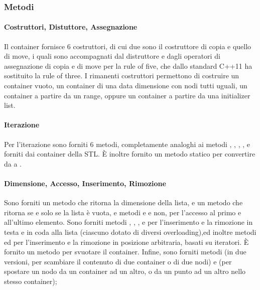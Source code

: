 \subsubsection{Metodi} %
\label{ssub:metodi}
\paragraph{Costruttori, Distuttore, Assegnazione} %
\label{par:costruttori_distuttore_assegnazione}
Il container fornisce 6 costruttori, di cui due sono il costruttore di copia e quello di move, i quali sono accompagnati dal distruttore e dagli operatori di assegnazione di copia e di move per la rule of five, che dallo standard C++11 ha sostituito la rule of three. I rimanenti costruttori permettono di costruire un container vuoto, un container di una data dimensione con nodi tutti uguali, un container a partire da un range, oppure un container a partire da una initializer list.
\paragraph{Iterazione} %
\label{par:iterazione}
Per l'iterazione sono forniti 6 metodi, completamente analoghi ai metodi , , , ,  e  forniti dai container della STL. È inoltre fornito un metodo statico  per convertire da  a .
\paragraph{Dimensione, Accesso, Inserimento, Rimozione} %
\label{par:dimensione_accesso_inserimento_rimozione}
Sono forniti un metodo  che ritorna la dimensione della lista, e un metodo  che ritorna  se e solo se la lista è vuota, e metodi  e   e non, per l'accesso al primo e all'ultimo elemento. Sono forniti metodi , , , e  per l'inserimento e la rimozione in testa e in coda alla lista (ciascuno dotato di diversi overloading),ed inoltre metodi  ed  per l'inserimento e la rimozione in posizione arbitraria, basati su iteratori. È fornito un metodo  per svuotare il container. Infine, sono forniti metodi  (in due versioni, per scambiare il contenuto di due container o di due nodi) e  (per spostare un nodo da un container ad un altro, o da un punto ad un altro nello stesso container);
